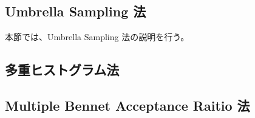 
\subsection{Umbrella Sampling 法}

本節では、Umbrella Sampling 法の説明を行う。

\subsection{多重ヒストグラム法}

\subsection{Multiple Bennet Acceptance Raitio 法}
